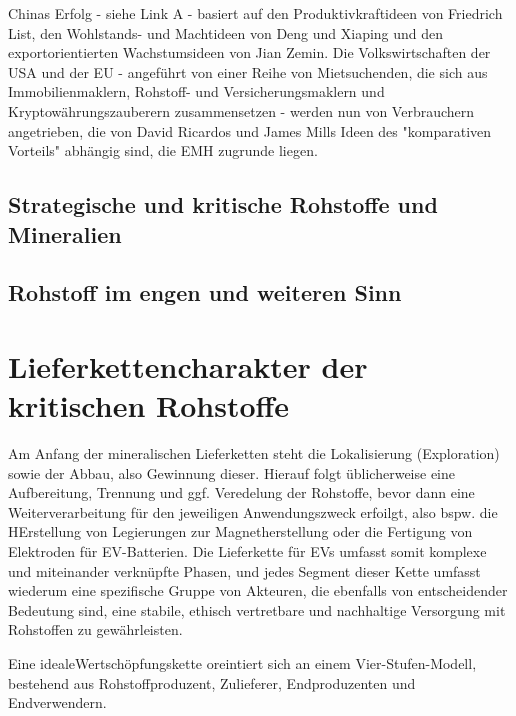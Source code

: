 \documentclass[12pt,a4paper,oneside]{book} %
\begin{document}
{	Chinas Erfolg - siehe Link A - basiert auf den Produktivkraftideen von Friedrich List, den Wohlstands- und Machtideen von Deng und Xiaping und den exportorientierten Wachstumsideen von Jian Zemin. Die Volkswirtschaften der USA und der EU - angeführt von einer Reihe von Mietsuchenden, die sich aus Immobilienmaklern, Rohstoff- und Versicherungsmaklern und Kryptowährungszauberern zusammensetzen - werden nun von Verbrauchern angetrieben, die von David Ricardos und James Mills Ideen des "komparativen Vorteils" abhängig sind, die EMH zugrunde liegen.
	
	\subsection{Strategische und kritische Rohstoffe und Mineralien}
	
	\subsection{Rohstoff im engen und weiteren Sinn}
	
	\section{Lieferkettencharakter der kritischen Rohstoffe}
	
	Am Anfang der mineralischen Lieferketten steht die Lokalisierung (Exploration) sowie der Abbau, also Gewinnung dieser. Hierauf folgt üblicherweise eine Aufbereitung, Trennung und ggf. Veredelung der Rohstoffe, bevor dann eine Weiterverarbeitung für den jeweiligen Anwendungszweck erfoilgt, also bspw. die HErstellung von Legierungen zur Magnetherstellung oder die Fertigung von Elektroden für EV-Batterien. Die Lieferkette für EVs umfasst somit komplexe und miteinander verknüpfte Phasen, und jedes Segment dieser Kette umfasst wiederum eine spezifische Gruppe von Akteuren, die ebenfalls von entscheidender Bedeutung sind, eine stabile, ethisch vertretbare und nachhaltige Versorgung mit Rohstoffen zu gewährleisten.\autocites{Carreon, A. R. (2023). The EV battery supply chain explained. https://rmi.org/the-ev-battery-supply-chain-explained/}{Miuc, Svigelj: The strategic role of critical minerals in electric vehicle production}
	
	Eine \glqq ideale\grqq Wertschöpfungskette oreintiert sich an einem Vier-Stufen-Modell, bestehend aus Rohstoffproduzent, Zulieferer, Endproduzenten und Endverwendern.\autocite{IW Rohstoffe für die Industrie  S. 24}
	
}
\end{document}
